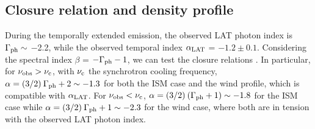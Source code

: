 \documentclass[preprint]{aastex631}
\newcommand{\red}[1]{\textcolor{red}{#1}}
\newcommand\rg[1]{{\color{seagreen}[[[RG: #1]]]}} %
\begin{document}
\subsection{Closure relation and density profile}
\label{sec:closure}
During the temporally extended emission, the observed LAT photon index is $\Gamma_{\rm ph} \sim$ $-$2.2, while the observed temporal index $\alpha_{\rm LAT}$ = $-1.2 \pm 0.1$. Considering the spectral index $\beta$ = $-\Gamma_{\rm ph}-1$, we can test the closure relations \citep{CLOSURE_RELATIONS_TAK}. In particular, for $\nu_{\rm obs} > \nu_{\rm c}$, with $\nu_{\rm c}$ the synchrotron cooling frequency, $\alpha = (3/2) \: \Gamma_{\rm ph} + 2 \sim -1.3$ for both the ISM case and the wind profile, which is compatible with $\alpha_{\rm LAT}$. For $\nu_{\rm obs} < \nu_{\rm c}$, $\alpha = (3/2) \: (\Gamma_{\rm ph} + 1) \sim -1.8$ for the ISM case while $\alpha = (3/2) \: \Gamma_{\rm ph} + 1 \sim -2.3$ for the wind case, where both are in tension with the observed LAT photon index. 

\end{document}
